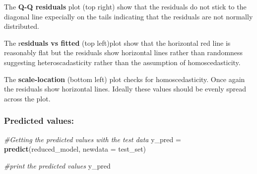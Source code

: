 \documentclass[
]{article}
\newenvironment{Shaded}{\begin{snugshade}}{\end{snugshade}}
\newcommand{\AttributeTok}[1]{\textcolor[rgb]{0.13,0.29,0.53}{#1}}
\newcommand{\CommentTok}[1]{\textcolor[rgb]{0.56,0.35,0.01}{\textit{#1}}}
\newcommand{\FunctionTok}[1]{\textcolor[rgb]{0.13,0.29,0.53}{\textbf{#1}}}
\newcommand{\NormalTok}[1]{#1}
\newcommand{\OtherTok}[1]{\textcolor[rgb]{0.56,0.35,0.01}{#1}}
\begin{document}
The \textbf{Q-Q residuals} plot (top right) show that the residuals do
not stick to the diagonal line expecially on the tails indicating that
the residuals are not normally distributed.

The r\textbf{esiduals vs fitted} (top left)plot show that the horizontal
red line is reasonably flat but the residuals show horizontal lines
rather than randomness suggesting heteroscadasticity rather than the
assumption of homoscedasticity.

The \textbf{scale-location} (bottom left) plot checks for
homoscedasticity. Once again the residuals show horizontal lines.
Ideally these values should be evenly spread across the plot.

\subsubsection{Predicted values:}\label{predicted-values}

\begin{Shaded}
\begin{Highlighting}[]
\CommentTok{\#Getting the predicted values with the test data}
\NormalTok{y\_pred }\OtherTok{=} \FunctionTok{predict}\NormalTok{(reduced\_model, }\AttributeTok{newdata =}\NormalTok{ test\_set)}

\CommentTok{\#print the predicted values}
\NormalTok{y\_pred}
\end{Highlighting}
\end{Shaded}
\end{document}
